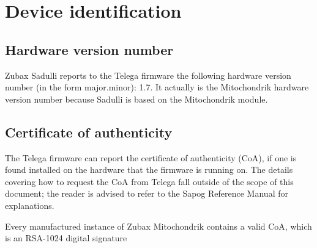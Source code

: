 \documentclass{zubaxdoc}
\begin{document}
\section{Device identification}

\subsection{Hardware version number}

Zubax Sadulli reports to the Telega firmware the following hardware version number
(in the form major.minor): 1.7. It actually is the Mitochondrik hardware version number because Sadulli is based on the Mitochondrik module. 

\subsection{Certificate of authenticity}\label{sec:certificate_of_authenticity}

The Telega firmware can report the certificate of authenticity (CoA),
if one is found installed on the hardware that the firmware is running on.
The details covering how to request the CoA from Telega fall outside of the scope of this document;
the reader is advised to refer to the Sapog Reference Manual for explanations.

Every manufactured instance of Zubax Mitochondrik contains a valid CoA, which is an RSA-1024 digital signature
\end{document}
